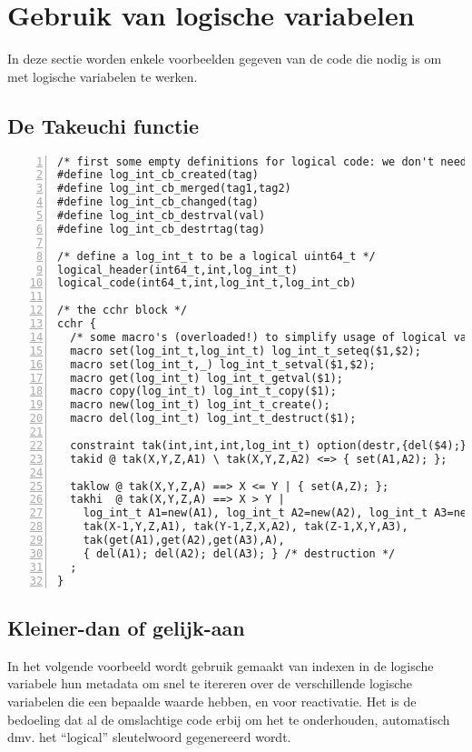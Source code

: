 \section{Gebruik van logische variabelen}

In deze sectie worden enkele voorbeelden gegeven van de code die nodig is om met logische variabelen te werken.

\subsection{De Takeuchi functie} \label{sec:tak-cchr}

{\scriptsize
\begin{Verbatim}[frame=single,numbers=left]
/* first some empty definitions for logical code: we don't need reactivation */
#define log_int_cb_created(tag)
#define log_int_cb_merged(tag1,tag2)
#define log_int_cb_changed(tag)
#define log_int_cb_destrval(val)
#define log_int_cb_destrtag(tag)

/* define a log_int_t to be a logical uint64_t */
logical_header(int64_t,int,log_int_t)
logical_code(int64_t,int,log_int_t,log_int_cb)

/* the cchr block */
cchr {
  /* some macro's (overloaded!) to simplify usage of logical variables */
  macro set(log_int_t,log_int_t) log_int_t_seteq($1,$2);
  macro set(log_int_t,_) log_int_t_setval($1,$2);
  macro get(log_int_t) log_int_t_getval($1);
  macro copy(log_int_t) log_int_t_copy($1);
  macro new(log_int_t) log_int_t_create();
  macro del(log_int_t) log_int_t_destruct($1);

  constraint tak(int,int,int,log_int_t) option(destr,{del($4);}) option(init,{copy($4);})
  takid @ tak(X,Y,Z,A1) \ tak(X,Y,Z,A2) <=> { set(A1,A2); };
  
  taklow @ tak(X,Y,Z,A) ==> X <= Y | { set(A,Z); };
  takhi  @ tak(X,Y,Z,A) ==> X > Y | 
    log_int_t A1=new(A1), log_int_t A2=new(A2), log_int_t A3=new(A3), /* creation */
    tak(X-1,Y,Z,A1), tak(Y-1,Z,X,A2), tak(Z-1,X,Y,A3), 
    tak(get(A1),get(A2),get(A3),A),
    { del(A1); del(A2); del(A3); } /* destruction */
  ;
}
\end{Verbatim}
}

\subsection{Kleiner-dan of gelijk-aan} \label{sec:leq-cchr}

In het volgende voorbeeld wordt gebruik gemaakt van indexen in de logische variabele hun metadata om snel te itereren over de verschillende logische variabelen die een bepaalde waarde hebben, en voor reactivatie. Het is de bedoeling dat al de omslachtige code erbij om het te onderhouden, automatisch dmv. het ``logical'' sleutelwoord gegenereerd wordt.

